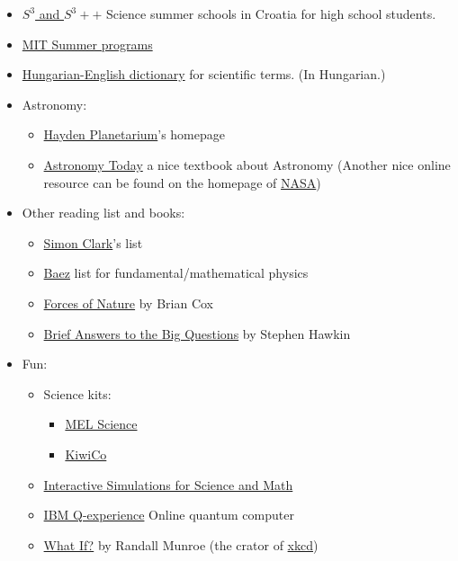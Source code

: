 \documentclass{article}
\begin{document}
\begin{itemize}
\item \href{https://drustvo-evo.hr/s3/}{$S^3$ and $S^3++$} Science summer schools in Croatia for high school students.

\item \href{https://mitadmissions.org/apply/prepare/summer/}{MIT Summer programs}

\item \href{http://cuhs.co.uk/wp-content/uploads/2011/12/Szakszavak.pdf}{Hungarian-English dictionary} for scientific terms. (In Hungarian.)

\item Astronomy:
\begin{itemize}
    \item \href{https://www.haydenplanetarium.org/}{Hayden Planetarium}'s homepage
    \item \href{https://www.goodreads.com/book/show/23512.Astronomy_Today}{Astronomy Today} a nice textbook about Astronomy (Another nice online resource can be found on the homepage of \href{https://solarsystem.nasa.gov/basics/}{NASA})
\end{itemize}

\item Other reading list and books:

\begin{itemize}
    \item \href{https://www.youtube.com/watch?v=p9s2fBYA4fU}{Simon Clark}'s list
    \item \href{http://math.ucr.edu/home/baez/books.html}{Baez} list for fundamental/mathematical physics
    \item \href{https://www.goodreads.com/book/show/30359599-forces-of-nature}{Forces of Nature} by Brian Cox
    \item \href{https://www.goodreads.com/book/show/40277241-brief-answers-to-the-big-questions}{Brief Answers to the Big Questions} by Stephen Hawkin
\end{itemize}


\item Fun:
\begin{itemize}
    \item Science kits:
    \begin{itemize}
        \item \href{https://melscience.com/US-en/}{MEL Science}
        \item \href{https://www.kiwico.com/kiwi}{KiwiCo}
    \end{itemize}
    \item \href{https://phet.colorado.edu/}{Interactive Simulations for Science and Math}
    \item \href{https://quantum-computing.ibm.com/}{IBM Q-experience} Online quantum computer
    \item \href{https://www.goodreads.com/book/show/21413662-what-if-serious-scientific-answers-to-absurd-hypothetical-questions}{What If?} by Randall Munroe (the crator of \href{https://xkcd.com/}{xkcd}) 
\end{itemize}


\end{itemize}
\end{document}
